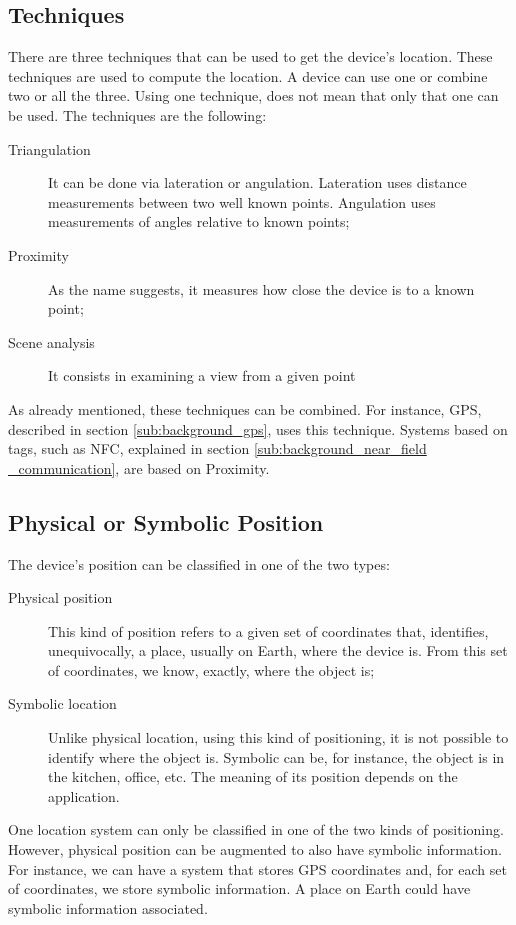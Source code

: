 \subsection{Techniques}
\label{sub:background_techniques}
There are three techniques that can be used to get the device's location.
These techniques are used to compute the location.
A device can use one or combine two or all the three.
Using one technique, does not mean that only that one can be used.
The techniques are the following:
\begin{description}
  \item[Triangulation] It can be done via lateration or angulation. Lateration uses distance measurements between two well known points.
  Angulation uses measurements of angles relative to known points;
  \item[Proximity] As the name suggests, it measures how close the device is to a known point;
  \item[Scene analysis] It consists in examining a view from a given point
\end{description}

As already mentioned, these techniques can be combined.
For instance, \gls{GPS}, described in section \ref{sub:background_gps}, uses this technique.
Systems based on tags, such as \gls{NFC}, explained in section \ref{sub:background_near_field _communication}, are based on Proximity.

\subsection{Physical or Symbolic Position}
\label{sub:background_physical_or_symbolic_position}
The device's position can be classified in one of the two types:
\begin{description}
  \item[Physical position] This kind of position refers to a given set of coordinates that, identifies, unequivocally, a place, usually on Earth, where the device is. From this set of coordinates, we know, exactly, where the object is;
  \item[Symbolic location] Unlike physical location, using this kind of positioning, it is not possible to identify where the object is. Symbolic can be, for instance, the object is in the kitchen, office, etc. The meaning of its position depends on the application.
\end{description}

One location system can only be classified in one of the two kinds of positioning.
However, physical position can be augmented to also have symbolic information.
For instance, we can have a system that stores \gls{GPS} coordinates and, for each set of coordinates, we store symbolic information.
A place on Earth could have symbolic information associated.

